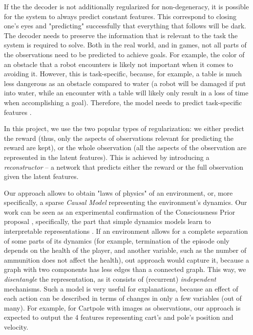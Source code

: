 \documentclass[a4paper,11pt,oneside]{report}
\begin{document}
If the the decoder is not additionally regularized for non-degeneracy, it is possible for the system to always predict constant features. This correspond to closing one's eyes and "predicting" successfully that everything that follows will be dark. The decoder needs to preserve the information that is relevant to the task the system is required to solve. Both in the real world, and in games, not all parts of the observations need to be predicted to achieve goals. For example, the color of an obstacle that a robot encounters is likely not important when it comes to avoiding it. However, this is task-specific, because, for example, a table is much less dangerous as an obstacle compared to water (a robot will be damaged if put into water, while an encounter with a table will likely only result in a loss of time when accomplishing a goal). Therefore, the model needs to predict task-specific features \cite{Cortese2020}.

In this project, we use the two popular types of regularization: we either predict the reward (thus, only the aspects of observations relevant for predicting the reward are kept), or the whole observation (all the aspects of the observation are represented in the latent features). This is achieved by introducing a {\em reconstructor} -- a network that predicts either the reward or the full observation given the latent features.

Our approach allows to obtain "laws of physics" of an environment, or, more specifically, a sparse {\em Causal Model} \cite{Pearl2020,Wong2020} representing the environment's dynamics.
Our work can be seen as an experimental confirmation of the Consciousness Prior proposal \cite{Bengio2017}, specifically, the part that simple dynamics models learn to interpretable representations \cite{Barcelo2020,Cranmer2020,Goyal2021}.
If an environment allows for a complete separation of some parts of its dynamics (for example, termination of the episode only depends on the health of the player, and another variable, such as the number of ammunition does not affect the health), out approach would capture it, because a graph with two components has less edges than a connected graph. This way, we {\em disentangle} the representation, as it consists of (recurrent) {\em independent} mechanisms.
Such a model is very useful for explanations, because an effect of each action can be described in terms of changes in only a few variables (out of many). For example, for Cartpole with images as observations, our approach is expected to output the 4 features representing cart's and pole's position and velocity.
\end{document}
